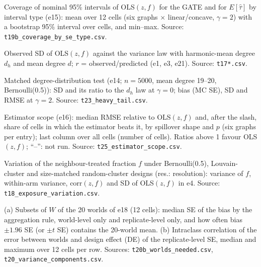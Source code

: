 \begin{table}[h]
\caption{Coverage of nominal 95\% intervals of OLS$(z,f)$ for the GATE and for $E[\hat\tau]$ by interval type (e15): mean over 12 cells (six graphs $\times$ linear/concave, $\gamma=2$) with a bootstrap 95\% interval over cells, and min--max. Source: \texttt{t19b\_coverage\_by\_se\_type.csv}.}
\label{tab:cov2}
\centering\scriptsize\setlength\tabcolsep{3pt}
\resizebox{\linewidth}{!}{}
\end{table}
\begin{table}[h]
\caption{Observed SD of OLS$(z,f)$ against the variance law with harmonic-mean degree $d_h$ and mean degree $d$; $r$ = observed/predicted (e1, e3, e21). Source: \texttt{t17*.csv}.}
\label{tab:vlaw}
\centering\scriptsize\setlength\tabcolsep{3pt}
\resizebox{\linewidth}{!}{}
\end{table}
\begin{table}[h]
\caption{Matched degree-distribution test (e14; $n=5000$, mean degree 19--20, Bernoulli(0.5)): SD and its ratio to the $d_h$ law at $\gamma=0$; bias (MC SE), SD and RMSE at $\gamma=2$. Source: \texttt{t23\_heavy\_tail.csv}.}
\label{tab:heavy}
\centering\scriptsize\setlength\tabcolsep{3pt}
\resizebox{\linewidth}{!}{}
\end{table}
\begin{table}[h]
\caption{Estimator scope (e16): median RMSE relative to OLS$(z,f)$ and, after the slash, share of cells in which the estimator beats it, by spillover shape and $p$ (six graphs per entry); last column over all cells (number of cells). Ratios above 1 favour OLS$(z,f)$; ``--'': not run. Source: \texttt{t25\_estimator\_scope.csv}.}
\label{tab:scope}
\centering\scriptsize\setlength\tabcolsep{3pt}
\resizebox{\linewidth}{!}{}
\end{table}
\begin{table}[h]
\caption{Variation of the neighbour-treated fraction $f$ under Bernoulli(0.5), Louvain-cluster and size-matched random-cluster designs (res.: resolution): variance of $f$, within-arm variance, $\mathrm{corr}(z,f)$ and SD of OLS$(z,f)$ in e4. Source: \texttt{t18\_exposure\_variation.csv}.}
\label{tab:expo}
\centering\scriptsize\setlength\tabcolsep{3pt}
\resizebox{\linewidth}{!}{}
\end{table}
\begin{table}[h]
\caption{(a) Subsets of $W$ of the 20 worlds of e18 (12 cells): median SE of the bias by the aggregation rule, world-level only and replicate-level only, and how often bias $\pm1.96$ SE (or $\pm t$ SE) contains the 20-world mean. (b) Intraclass correlation of the error between worlds and design effect (DE) of the replicate-level SE, median and maximum over 12 cells per row. Sources: \texttt{t20b\_worlds\_needed.csv}, \texttt{t20\_variance\_components.csv}.}
\label{tab:worlds}
\centering\scriptsize\setlength\tabcolsep{3pt}
\resizebox{\linewidth}{!}{}
\end{table}

